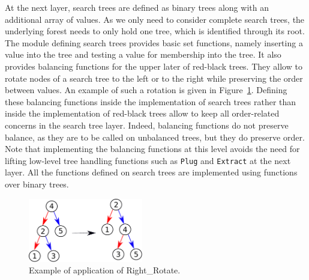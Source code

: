 \documentclass{llncs}
\begin{document}
At the next layer, search trees are defined as binary trees along with an
additional array of values. As we only need to consider complete search trees,
the underlying forest needs to only hold one tree, which is identified through
its root. The module defining search trees provides basic set functions, namely
inserting a value into the tree and testing a value for membership into the
tree. It also provides balancing functions for the upper later of red-black
trees. They allow to rotate nodes of a search tree to the left or to the right
while preserving the order between values. An example of such a rotation is
given in Figure~\ref{fig-search-rot}.  Defining these balancing functions
inside the implementation of search trees rather than inside the implementation
of red-black trees allow to keep all order-related concerns in the search tree
layer. Indeed, balancing functions do not preserve balance, as they are to be
called on unbalanced trees, but they do preserve order. Note that implementing
the balancing functions at this level avoids the need for lifting low-level
tree handling functions such as \texttt{Plug} and \texttt{Extract} at the next
layer. All the functions defined on search trees are implemented using
functions over binary trees.




\begin{figure}[ht]
\begin{center}
\includegraphics[width=5cm]{rotate_right.pdf}
\caption{\label{fig-search-rot} Example of application of Right\_Rotate.}
\end{center}
\end{figure}
\end{document}
